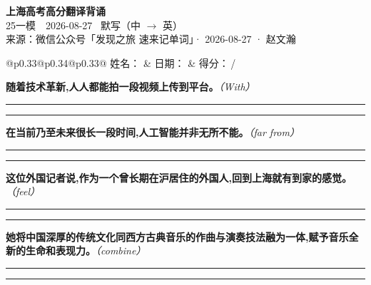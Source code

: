 \documentclass[11pt,a4paper]{article}
\newcommand{\num}[1]{\makebox[1.9em][r]{#1.}\hspace{0.3em}}
\newcommand{\wline}{\noindent\rule{\linewidth}{0.4pt}}
\newcommand{\prompt}[1]{\emph{\textcolor{tipblue}{\small（#1）}}}
\begin{document}
\pagestyle{plain}
\begin{center}
{\LARGE\bfseries 上海高考高分翻译背诵 }\\[0.25em]
{\large 25一模　2026-08-27 \quad\ 默写（中 $\to$ 英）}\\[0.35em]
{\footnotesize 来源：微信公众号「发现之旅 速来记单词」· 2026-08-27 · 赵文瀚}
\end{center}

\vspace{0.4em}
\noindent\begin{tabular}{@{}p{0.33\textwidth}@{}p{0.34\textwidth}@{}p{0.33\textwidth}@{}}
姓名：\underline{\hspace{2.0cm}} & 日期：\underline{\hspace{2.0cm}} & 得分：\underline{\hspace{1.4cm}}\,/ \\
\end{tabular}

\vspace{0.5em}

\vspace{0.8em}
\num{1}\textbf{随着技术革新,人人都能拍一段视频上传到平台。}\prompt{With}

\vspace{0.3em}

\wline\vspace{0.3em}
\wline

\num{2}\textbf{在当前乃至未来很长一段时间,人工智能并非无所不能。}\prompt{far from}

\vspace{0.3em}

\wline\vspace{0.3em}
\wline

\num{3}\textbf{这位外国记者说,作为一个曾长期在沪居住的外国人,回到上海就有到家的感觉。}\prompt{feel}

\vspace{0.3em}

\wline\vspace{0.3em}
\wline

\num{4}\textbf{她将中国深厚的传统文化同西方古典音乐的作曲与演奏技法融为一体,赋予音乐全新的生命和表现力。}\prompt{combine}

\vspace{0.3em}

\wline\vspace{0.3em}
\wline
\end{document}

